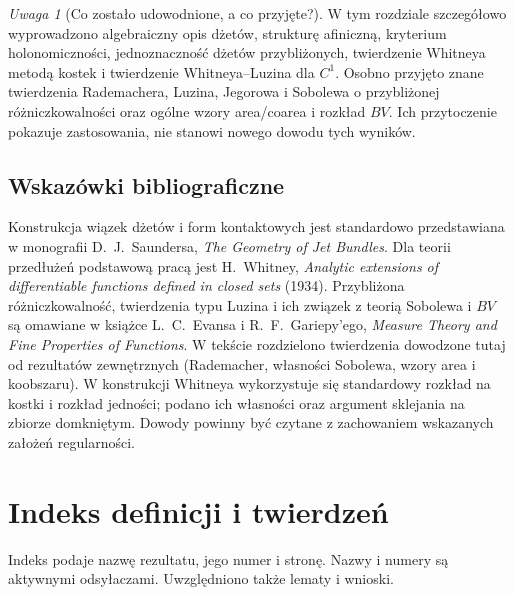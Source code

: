 \documentclass[11pt,a4paper,oneside]{book}
\numberwithin{equation}{chapter}
\theoremstyle{plain}
\theoremstyle{definition}
\theoremstyle{remark}
\newtheorem{uwaga}[twierdzenie]{Uwaga}
\begin{document}
\begin{uwaga}[Co zostało udowodnione, a co przyjęte?]
W tym rozdziale szczegółowo wyprowadzono algebraiczny opis
dżetów, strukturę afiniczną, kryterium holonomiczności,
jednoznaczność dżetów przybliżonych, twierdzenie Whitneya
metodą kostek i twierdzenie Whitneya--Luzina dla $C^1$.
Osobno przyjęto znane twierdzenia Rademachera, Luzina,
Jegorowa i Sobolewa o przybliżonej różniczkowalności
oraz ogólne wzory area/coarea i rozkład $BV$.
Ich przytoczenie pokazuje zastosowania, nie stanowi
nowego dowodu tych wyników.
\end{uwaga}


\section*{Wskazówki bibliograficzne}
Konstrukcja wiązek dżetów i form kontaktowych jest standardowo
przedstawiana w monografii D.~J.~Saundersa,
\emph{The Geometry of Jet Bundles}. Dla teorii przedłużeń
podstawową pracą jest H.~Whitney,
\emph{Analytic extensions of differentiable functions defined
in closed sets} (1934). Przybliżona różniczkowalność,
twierdzenia typu Luzina i ich związek z teorią Sobolewa i $BV$
są omawiane w książce L.~C.~Evansa i R.~F.~Gariepy'ego,
\emph{Measure Theory and Fine Properties of Functions}.
W tekście rozdzielono twierdzenia dowodzone tutaj od
rezultatów zewnętrznych (Rademacher, własności Sobolewa,
wzory area i koobszaru). W konstrukcji Whitneya wykorzystuje
się standardowy rozkład na kostki i rozkład jedności;
podano ich własności oraz argument sklejania na zbiorze
domkniętym. Dowody powinny być czytane z zachowaniem
wskazanych założeń regularności.


\backmatter

\chapter*{Indeks definicji i twierdzeń}
Indeks podaje nazwę rezultatu, jego numer i stronę. Nazwy i numery są aktywnymi odsyłaczami.
Uwzględniono także lematy i wnioski.
\end{document}
